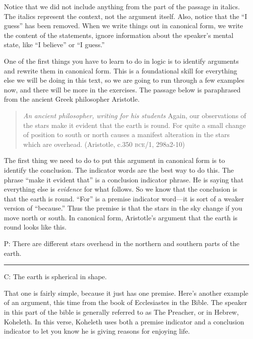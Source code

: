 Notice that we did not include anything from the part of the passage in italics. The italics represent the context, not the argument itself. Also, notice that the ``I guess'' has been removed. When we write things out in canonical form, we write the content of the statements, ignore information about the speaker's mental state, like ``I believe'' or ``I guess.'' 

One of the first things you have to learn to do in logic is to identify arguments and rewrite them in canonical form. This is a foundational skill for everything else we will be doing in this text, so we are going to run through a few examples now, and there will be more in the exercises. The passage below is paraphrased from the ancient Greek philosopher Aristotle. 

\begin{quotation}\noindent \textit{An ancient philosopher, writing for his students} Again, our observations of the stars make it evident that the earth is round. For quite a small change of position to south or north causes a manifest alteration in the stars which are overhead. (Aristotle, c.350 \textsc{bce}/1\citeyear{Aristotle1984c}, 298a2-10)
\label{on_the_heavens} \end{quotation}

The first thing we need to do to put this argument in canonical form is to identify the conclusion. The indicator words are the best way to do this. The phrase ``make it evident that'' is a conclusion indicator phrase. He is saying that everything else is \textit{evidence} for what follows. So we know that the conclusion is that the earth is round. ``For'' is a premise indicator word---it is sort of a weaker version of ``because.''  Thus the premise is that the stars in the sky change if you move north or south. In canonical form, Aristotle's argument that the earth is round looks like this.\\


\begin{earg}
\item[P:] There are different stars overhead in the northern and southern parts of the earth.
\vspace{-.5em}
\item [] \rule{0.9\linewidth}{.5pt} 
\item[C:] The earth is spherical in shape. 
\end{earg} 

That one is fairly simple, because it just has one premise. Here's another example of an argument, this time from the book of Ecclesiastes in the Bible. The speaker in this part of the bible is generally referred to as The Preacher, or in Hebrew, Koheleth. In this verse, Koheleth uses both a premise indicator and a conclusion indicator to let you know he is giving reasons for enjoying life.

